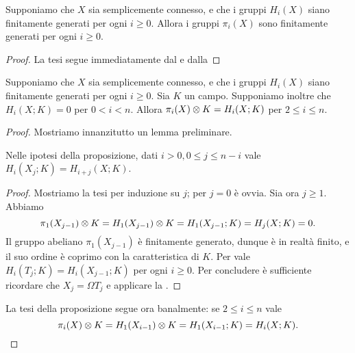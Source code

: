 \begin{corollary}
Supponiamo che $X$ sia semplicemente connesso, e che i gruppi $H_i(X)$ siano finitamente generati per ogni $i\ge 0$. Allora i gruppi $\pi_i(X)$ sono finitamente generati per ogni $i\ge 0$.
\end{corollary}
\begin{proof}
La tesi segue immediatamente dal  e dalla 
\end{proof}

\begin{proposition}
Supponiamo che $X$ sia semplicemente connesso, e che i gruppi $H_i(X)$ siano finitamente generati per ogni $i\ge 0$. Sia $K$ un campo. Supponiamo inoltre che $H_i(X;K)=0$ per $0<i<n$. Allora $\pi_i(X)\mathbin{\otimes} K=H_i(X;K)$ per $2\le i\le n$.
\end{proposition}
\begin{proof}
Mostriamo innanzitutto un lemma preliminare.
\begin{lemma*}
Nelle ipotesi della proposizione, dati $i>0,0\le j\le n-i$ vale $H_i(X_j;K)=H_{i+j}(X;K)$.
\end{lemma*}
\begin{proof}
Mostriamo la tesi per induzione su $j$; per $j=0$ è ovvia. Sia ora $j\ge 1$. Abbiamo 
$$
\pi_1(X_{j-1})\mathbin{\otimes} K=H_1(X_{j-1})\mathbin{\otimes} K=H_1(X_{j-1};K)=H_j(X;K)=0.
$$
Il gruppo abeliano $\pi_1(X_{j-1})$ è finitamente generato, dunque è in realtà finito, e il suo ordine è coprimo con la caratteristica di $K$. Per \missing{} vale $H_i(T_j;K)=H_i(X_{j-1};K)$ per ogni $i\ge 0$. Per concludere è sufficiente ricordare che $X_j=\Omega T_j$ e applicare la .
\end{proof}
La tesi della proposizione segue ora banalmente: se $2\le i\le n$ vale
$$
\pi_i(X)\mathbin{\otimes} K=H_1(X_{i-1})\mathbin{\otimes} K=H_1(X_{i-1};K)=H_i(X;K).
$$
\end{proof}

